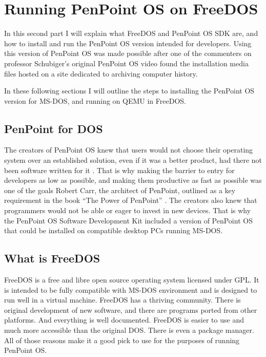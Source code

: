 \clearpage %

\section{Running PenPoint OS on FreeDOS}

In this second part I will explain what FreeDOS and PenPoint OS SDK are, and how
to install and run the PenPoint OS version intended for developers. Using this
version of PenPoint OS was made possible after one of the commenters on
professor Schubiger's original PenPoint OS video found the installation media
files hosted on a site dedicated to archiving computer history.

In these following sections I will outline the steps to installing the
PenPoint OS version for MS-DOS, and running on QEMU in FreeDOS.

\subsection{PenPoint for DOS}

The creators of PenPoint OS knew that users would not choose their operating
system over an established solution, even if it was a better product, had there
not been software written for it \cite{barbariansbillgates}. That is why making
the barrier to entry for developers as low as possible, and making them
productive as fast as possible was one of the goals Robert Carr, the architect
of PenPoint, outlined as a key requirement in the book ``The Power of
PenPoint'' \cite{carr1991}. The creators also knew that programmers would not
be able or eager to invest in new devices.  That is why the PenPoint OS Software
Development Kit included a version of PenPoint OS that could be installed on
compatible desktop PCs running MS-DOS.

\subsection{What is FreeDOS}

FreeDOS is a free and libre open source operating system licensed under GPL. It
is intended to be fully compatible with MS-DOS environment and is designed to
run well in a virtual machine. FreeDOS has a thriving community. There is
original development of new software, and there are programs ported from other
platforms. And everything is well documented.  FreeDOS is easier to use and
much more accessible than the original DOS.  There is even a package manager.
All of those reasons make it a good pick to use for the purposes of running
PenPoint OS.

